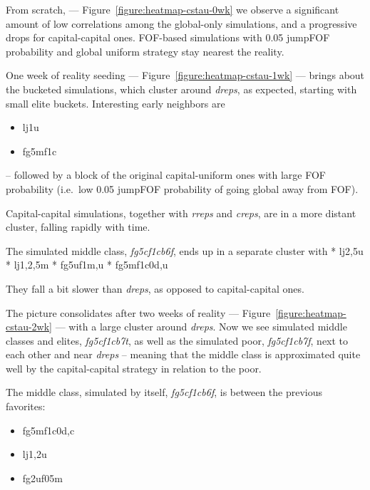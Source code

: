 \documentclass[10pt,oneside]{memoir}
\begin{document}
\begin{Spacing}{2}
From scratch, --- Figure~\ref{figure:heatmap-cstau-0wk} we observe a significant amount of low correlations among the global-only simulations, and a progressive drops for capital-capital ones.  FOF-based simulations with 0.05 jumpFOF probability and global uniform strategy stay nearest the reality.


One week of reality seeding --- Figure~\ref{figure:heatmap-cstau-1wk} --- brings about the bucketed simulations, which cluster around {\itshape dreps}, as expected, starting with small elite buckets.  Interesting early neighbors are


\begin{itemize}


\item lj1u

\item fg5mf1c
\end{itemize}

-- followed by a block of the original capital-uniform ones with large FOF probability (i.e.\ low 0.05 jumpFOF probability of going global away from FOF).


Capital-capital simulations, together with {\itshape rreps} and {\itshape creps}, are in a more distant cluster, falling rapidly with time.


The simulated middle class, {\itshape fg5cf1cb6f}, ends up in a separate cluster with
* lj{2,5}u
* lj{1,2,5}m
* fg5uf1{m,u}
* fg5mf1{c0d,u}


They fall a bit slower than {\itshape dreps}, as opposed to capital-capital ones.


The picture consolidates after two weeks of reality --- Figure~\ref{figure:heatmap-cstau-2wk} --- with a large cluster around {\itshape dreps}.  Now we see simulated middle classes and elites, {\itshape fg5cf1cb7t}, as well as the simulated poor, {\itshape fg5cf1cb7f}, next to each other and near {\itshape dreps} -- meaning that the middle class is approximated quite well by the capital-capital strategy in relation to the poor.  


The middle class, simulated by itself, {\itshape fg5cf1cb6f}, is between the previous favorites:


\begin{itemize}


\item fg5mf{1c0d,c}

\item lj{1,2}u

\item fg2uf05m


\end{itemize}
\end{Spacing}
\end{document}
